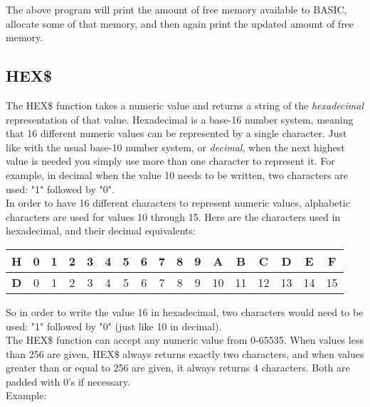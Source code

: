 The above program will print the amount of free memory available to BASIC,
allocate some of that memory, and then again print the updated amount of free
memory.\\

\subsection{HEX\$}

The {\ttfamily HEX\$} function takes a numeric value and returns a string of
the {\em hexadecimal} representation of that value.  Hexadecimal is a base-16
number system, meaning that 16 different numeric values can be represented by a
single character.  Just like with the usual base-10 number system, or {\em
decimal}, when the next highest value is needed you simply use more than one
character to represent it.  For example, in decimal when the value 10 needs to
be written, two characters are used: "1" followed by "0".\\

In order to have 16 different characters to represent numeric values,
alphabetic characters are used for values 10 through 15.  Here are the
characters used in hexadecimal, and their decimal equivalents:\\

\begin{tabular}{|c|c|c|c|c|c|c|c|c|c|c|c|c|c|c|c|c|}
	\hline
	{\bfseries H} & 0 & 1 & 2 & 3 & 4 & 5 & 6 & 7 & 8 & 9 & A & B & C & D & E & F \\ \hline
	{\bfseries D} & 0 & 1 & 2 & 3 & 4 & 5 & 6 & 7 & 8 & 9 & 10 & 11 & 12 & 13 & 14 & 15 \\ \hline
\end{tabular}

\vspace{16pt}

So in order to write the value 16 in hexadecimal, two characters would need to
be used: "1" followed by "0" (just like 10 in decimal).\\

The {\ttfamily HEX\$} function can accept any numeric value from 0-65535.  When
values less than 256 are given, {\ttfamily HEX\$} always returns exactly two
characters, and when values greater than or equal to 256 are given, it always
returns 4 characters.  Both are padded with 0's if necessary.\\

Example:\\

